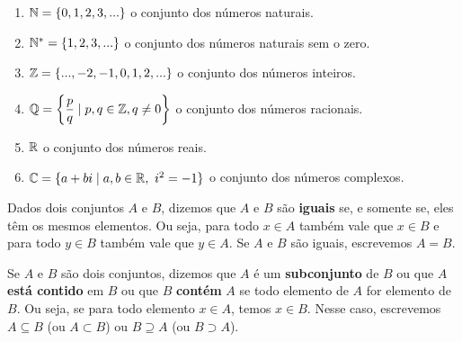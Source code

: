 \documentclass{beamer}
\begin{document}
    \begin{frame}
        \begin{enumerate}[label={\arabic*})]
            \item $\mathbb{N} = \{0,1,2,3,...\}$ o conjunto dos números naturais.\pause
            \vspace{.3cm}
            \item $\mathbb{N}^* = \{1,2,3,...\}$ o conjunto dos números naturais sem o zero.\pause
            \vspace{.3cm}
            \item $\mathbb{Z} = \{...,-2,-1,0,1,2,...\}$ o conjunto dos números inteiros.\pause
            \vspace{.3cm}
            \item $\mathbb{Q} = \left\{\dfrac{p}{q} \mid p,q \in \mathbb{Z}, q \neq 0 \right\}$ o conjunto dos números racionais.\pause
            \vspace{.3cm}
            \item $\mathbb{R} $ o conjunto dos números reais.\pause
            \vspace{.3cm}
            \item $\mathbb{C} = \{a + bi \mid a,b \in \mathbb{R},\ i^2 = -1\}$ o conjunto dos números complexos.
        \end{enumerate}
    \end{frame}

    \begin{frame}
        \begin{definicao}
            Dados dois conjuntos $A$ e $B$, \pause dizemos que $A$ e $B$ são \textbf{iguais} \pause se, e somente se, eles têm os mesmos elementos. \pause Ou seja, para todo $x \in A$ também vale que $x \in B$ \pause e para todo $y \in B$ também vale que $y \in A$. \pause Se $A$ e $B$ são iguais, \pause escrevemos $A = B$.\pause
        \end{definicao}

        \begin{definicao}
            Se $A$ e $B$ são dois conjuntos, \pause dizemos que $A$ é um \textbf{subconjunto} de $B$ \pause ou que $A$ \textbf{est\'a contido} em $B$ \pause ou que $B$ \textbf{contém} $A$ \pause se todo elemento de $A$ for elemento de $B$. \pause Ou seja, se para todo elemento $x \in A$, \pause temos $x \in B$. \pause Nesse caso, escrevemos $A \subseteq B$ (ou $A \subset B$) \pause ou $B \supseteq A$ (ou $B \supset A$).
        \end{definicao}
    \end{frame}
\end{document}
